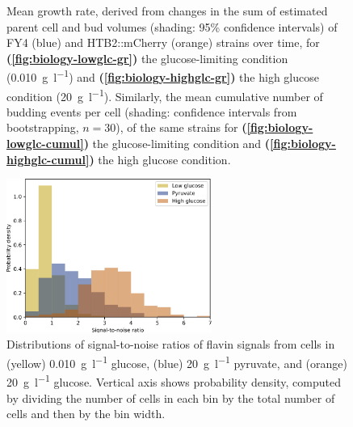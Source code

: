\begin{figure}
  \caption[
    Mean growth rate, derived from changes in the sum of estimated parent cell and bud volumes
    of FY4 and HTB2::mCherry strains over time during the glucose-starvation experiment, for
    the glucose-limiting condition and
    the high glucose condition.
    Similarly, the mean cumulative number of budding events per cell.
  ]{
    Mean growth rate, derived from changes in the sum of estimated parent cell and bud volumes (shading: 95\% confidence intervals) of FY4 (blue) and HTB2::mCherry (orange) strains over time, for \textbf{(\ref{fig:biology-lowglc-gr})} the glucose-limiting condition (\SI{0.010}{\gram~\litre^{-1}}) and \textbf{(\ref{fig:biology-highglc-gr})} the high glucose condition (\SI{20}{\gram~\litre^{-1}}).
    Similarly, the mean cumulative number of budding events per cell (shading: confidence intervals from bootstrapping, $n=30$), of the same strains for \textbf{(\ref{fig:biology-lowglc-cumul})} the glucose-limiting condition and \textbf{(\ref{fig:biology-highglc-cumul})} the high glucose condition.
  }
  \label{fig:biology-lowglc-gr-budprob}
\end{figure}


\begin{figure}
  \centering
  \includegraphics[width=0.6\textwidth]{csource_snrs_edit}

  \caption{
    Distributions of signal-to-noise ratios of flavin signals from cells in
    (yellow) \SI{0.010}{\gram~\litre^{-1}} glucose,
    (blue) \SI{20}{\gram~\litre^{-1}} pyruvate, and
    (orange) \SI{20}{\gram~\litre^{-1}} glucose.
    Vertical axis shows probability density, computed by dividing the number of cells in each bin by the total number of cells and then by the bin width.
  }
  \label{fig:biology-compare-snr}
\end{figure}


